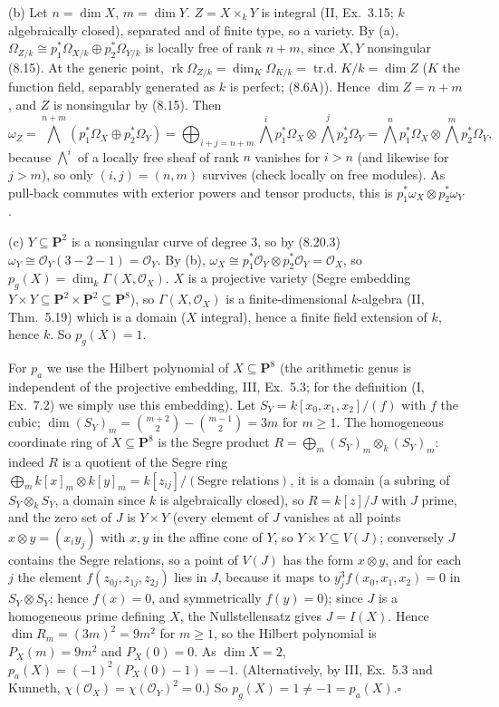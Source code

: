 \documentclass[11pt]{article}
\begin{document}
(b) Let $n=\dim X$, $m=\dim Y$. $Z=X\times_kY$ is integral (II, Ex.~3.15; $k$ algebraically closed), separated and of finite type, so a variety. By (a), $\Omega_{Z/k}\cong p_1^*\Omega_{X/k}\oplus p_2^*\Omega_{Y/k}$ is locally free of rank $n+m$, since $X,Y$ nonsingular (8.15). At the generic point, $\operatorname{rk}\Omega_{Z/k}=\dim_K\Omega_{K/k}=\operatorname{tr.d.}K/k=\dim Z$ ($K$ the function field, separably generated as $k$ is perfect; (8.6A)). Hence $\dim Z=n+m$, and $Z$ is nonsingular by (8.15). Then
\[\omega_Z=\textstyle\bigwedge^{n+m}(p_1^*\Omega_X\oplus p_2^*\Omega_Y)=\bigoplus_{i+j=n+m}\bigwedge^i p_1^*\Omega_X\otimes\bigwedge^jp_2^*\Omega_Y=\bigwedge^np_1^*\Omega_X\otimes\bigwedge^mp_2^*\Omega_Y,\]
because $\bigwedge^i$ of a locally free sheaf of rank $n$ vanishes for $i>n$ (and likewise for $j>m$), so only $(i,j)=(n,m)$ survives (check locally on free modules). As pull-back commutes with exterior powers and tensor products, this is $p_1^*\omega_X\otimes p_2^*\omega_Y$.

(c) $Y\subseteq\mathbf P^2$ is a nonsingular curve of degree $3$, so by (8.20.3) $\omega_Y\cong\mathcal O_Y(3-2-1)=\mathcal O_Y$. By (b), $\omega_X\cong p_1^*\mathcal O_Y\otimes p_2^*\mathcal O_Y=\mathcal O_X$, so $p_g(X)=\dim_k\Gamma(X,\mathcal O_X)$. $X$ is a projective variety (Segre embedding $Y\times Y\subseteq\mathbf P^2\times\mathbf P^2\subseteq\mathbf P^8$), so $\Gamma(X,\mathcal O_X)$ is a finite-dimensional $k$-algebra (II, Thm.~5.19) which is a domain ($X$ integral), hence a finite field extension of $k$, hence $k$. So $p_g(X)=1$.

For $p_a$ we use the Hilbert polynomial of $X\subseteq\mathbf P^8$ (the arithmetic genus is independent of the projective embedding, III, Ex.~5.3; for the definition (I, Ex.~7.2) we simply use this embedding). Let $S_Y=k[x_0,x_1,x_2]/(f)$ with $f$ the cubic; $\dim(S_Y)_m=\binom{m+2}2-\binom{m-1}2=3m$ for $m\ge1$. The homogeneous coordinate ring of $X\subseteq\mathbf P^8$ is the Segre product $R=\bigoplus_m(S_Y)_m\otimes_k(S_Y)_m$: indeed $R$ is a quotient of the Segre ring $\bigoplus_m k[x]_m\otimes k[y]_m=k[z_{ij}]/(\text{Segre relations})$, it is a domain (a subring of $S_Y\otimes_kS_Y$, a domain since $k$ is algebraically closed), so $R=k[z]/J$ with $J$ prime, and the zero set of $J$ is $Y\times Y$ (every element of $J$ vanishes at all points $x\otimes y=(x_iy_j)$ with $x,y$ in the affine cone of $Y$, so $Y\times Y\subseteq V(J)$; conversely $J$ contains the Segre relations, so a point of $V(J)$ has the form $x\otimes y$, and for each $j$ the element $f(z_{0j},z_{1j},z_{2j})$ lies in $J$, because it maps to $y_j^3f(x_0,x_1,x_2)=0$ in $S_Y\otimes S_Y$; hence $f(x)=0$, and symmetrically $f(y)=0$); since $J$ is a homogeneous prime defining $X$, the Nullstellensatz gives $J=I(X)$. Hence $\dim R_m=(3m)^2=9m^2$ for $m\ge1$, so the Hilbert polynomial is $P_X(m)=9m^2$ and $P_X(0)=0$. As $\dim X=2$, $p_a(X)=(-1)^2(P_X(0)-1)=-1$. (Alternatively, by III, Ex.~5.3 and Kunneth, $\chi(\mathcal O_X)=\chi(\mathcal O_Y)^2=0$.) So $p_g(X)=1\ne-1=p_a(X)$.\hfill$\square$
\end{document}
